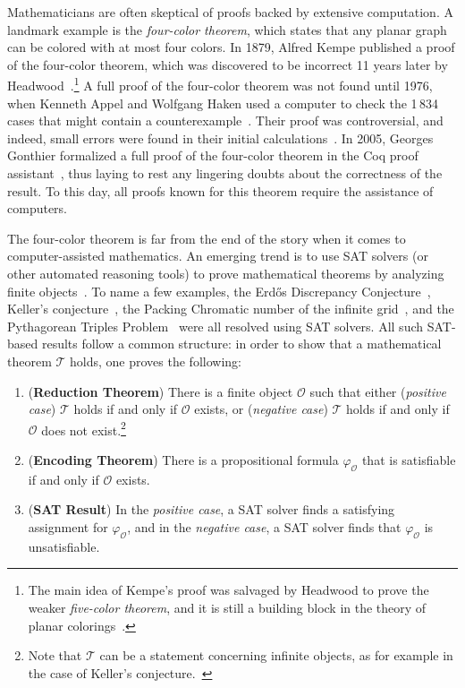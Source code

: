 Mathematicians are often skeptical of proofs backed by extensive computation.
A landmark example is the \emph{four-color theorem}, which states that any planar graph can be colored with at most four colors. 
In 1879, Alfred Kempe published a proof of the four-color theorem, which was discovered to be incorrect 11 years later by Headwood~\cite{Walters2004ItAT,Wilson2002GraphsCA}.\footnote{The main idea of Kempe's proof was salvaged by Headwood to prove the weaker \emph{five-color theorem}, and it is still a building block in the theory of planar colorings~\cite{Walters2004ItAT}.} 
A full proof of the four-color theorem was not found until 1976, when Kenneth Appel and Wolfgang Haken used a computer to check the 1\,834 cases that might contain a counterexample~\cite{appelFourColorProblem1978}.
Their proof was controversial, and indeed, small errors were found in their initial calculations~\cite{Walters2004ItAT,Wilson2002GraphsCA}.
In 2005, Georges Gonthier formalized a full proof of the four-color theorem in the \textsf{Coq} proof assistant~\cite{gonthierFourColourTheorem2008a}, thus laying to rest any lingering doubts about the correctness of the result.
To this day, all proofs known for this theorem require the assistance of computers.

The four-color theorem is far from the end of the story when it comes to computer-assisted mathematics.
An emerging trend is to use SAT solvers (or other automated reasoning tools) to prove mathematical theorems by analyzing finite objects~\cite{avigad2023mathematics}. 
To name a few examples, the Erd\H{o}s Discrepancy Conjecture~\cite{konev2014sat}, Keller's conjecture~\cite{brakensiek2023resolution}, the Packing Chromatic number of the infinite grid~\cite{Subercaseaux_Heule_2023}, and the Pythagorean Triples Problem~\cite{Heule_2016} were all resolved using SAT solvers.
All such SAT-based results follow a common structure: in order to show that a mathematical theorem $\mathcal{T}$ holds, one proves the following:
\begin{enumerate}
  \item (\textbf{Reduction Theorem}) There is a finite object $\mathcal{O}$ such that either (\emph{positive case}) $\mathcal{T}$ holds if and only if $\mathcal{O}$ exists, or (\emph{negative case}) $\mathcal{T}$ holds if and only if $\mathcal{O}$ does not exist.\footnote{Note that $\mathcal{T}$ can be a statement concerning infinite objects, as for example in the case of Keller's conjecture.~\cite{brakensiek2023resolution}}
  \item (\textbf{Encoding Theorem}) There is a propositional formula $\varphi_{\mathcal{O}}$ that is satisfiable if and only if $\mathcal{O}$ exists.
  \item (\textbf{SAT Result}) In the \emph{positive case}, a SAT solver finds a satisfying assignment for $\varphi_{\mathcal{O}}$, and in the \emph{negative case}, a SAT solver finds that $\varphi_{\mathcal{O}}$ is unsatisfiable.
\end{enumerate}

